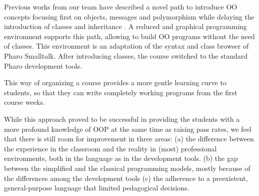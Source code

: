 \medskip
Previous works from our team \cite{lombardi_instances_2007,lombardi_carlos_alumnos_2008,griggio_programming_2011,spigariol_lucas_ensenando_2013} have described 
a novel path to introduce OO concepts focusing first on objects, messages and polymorphism while delaying the introduction of classes and inheritance%
.
A reduced and graphical programming environment supports this path, allowing to build OO programs without the need of classes.
This environment is an adaptation of the syntax and class browser of Pharo Smalltalk. After introducing classes, the course switched to the standard Pharo development tools.

This way of organizing a course provides a more gentle learning curve to students, so that they can write completely working programs from the first course weeks.

\medskip
While this approach proved to be successful in providing the students with a more profound knowledge of OOP at the same time as raising pass rates, 
we feel that there is still room for improvement in three areas:
(a) the difference between the experience in the classroom and the reality in (most) professional environments, both in the language as in the development tools.
(b) the gap between the simplified and the classical programming models, mostly because of the differences among the development tools
(c) the adherence to a preexistent, general-purpose language that limited pedagogical decisions.

